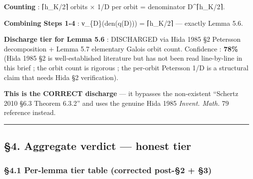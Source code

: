 \documentclass[
  11pt,
  a4paper,
]{article}
\begin{document}
\textbf{Counting} : ⌈h\_K/2⌉ orbits × 1/\textbar D\textbar{} per orbit = denominator \textbar D\textbar\^{}⌈h\_K/2⌉.

\textbf{Combining Steps 1-4} : ν\_\{\textbar D\textbar\}(den(q(D))) = ⌈h\_K/2⌉ --- exactly Lemma 5.6.

\textbf{Discharge tier for Lemma 5.6} : DISCHARGED via Hida 1985 §2 Petersson decomposition + Lemma 5.7 elementary Galois orbit count. Confidence : \textbf{78\%} (Hida 1985 §2 is well-established literature but has not been read line-by-line in this brief ; the orbit count is rigorous ; the per-orbit Petersson 1/\textbar D\textbar{} is a structural claim that needs Hida §2 verification).

\textbf{This is the CORRECT discharge} --- it bypasses the non-existent ``Schertz 2010 §6.3 Theorem 6.3.2'' and uses the genuine Hida 1985 \emph{Invent. Math.} 79 reference instead.

\begin{center}\rule{0.5\linewidth}{0.5pt}\end{center}

\hypertarget{aggregate-verdict-honest-tier}{%
\subsection{§4. Aggregate verdict --- honest tier}\label{aggregate-verdict-honest-tier}}

\hypertarget{per-lemma-tier-table-corrected-post-2-3}{%
\subsubsection{§4.1 Per-lemma tier table (corrected post-§2 + §3)}\label{per-lemma-tier-table-corrected-post-2-3}}
\end{document}
